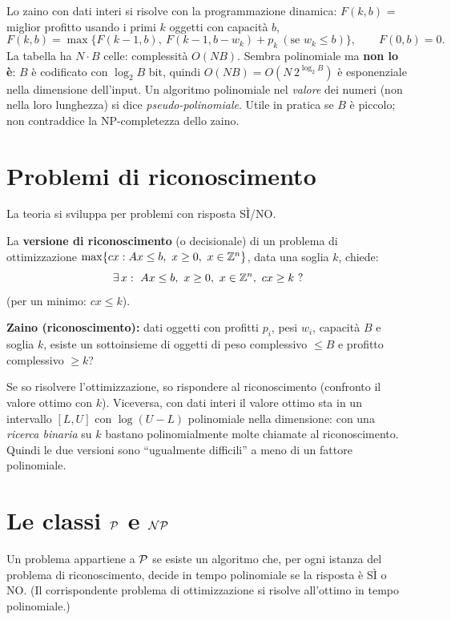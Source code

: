 \begin{extra}
Lo zaino con dati interi si risolve con la programmazione dinamica: $F(k,b)$ = miglior profitto usando i primi $k$ oggetti con capacità $b$,
\[F(k,b)=\max\{F(k-1,b),\ F(k-1,b-w_k)+p_k\ (\text{se } w_k\le b)\},\qquad F(0,b)=0.\]
La tabella ha $N\cdot B$ celle: complessità $O(NB)$. Sembra polinomiale ma \textbf{non lo è}: $B$ è codificato con $\log_2B$ bit, quindi $O(NB)=O(N\,2^{\log_2B})$ è esponenziale nella dimensione dell'input. Un algoritmo polinomiale nel \emph{valore} dei numeri (non nella loro lunghezza) si dice \emph{pseudo-polinomiale}. Utile in pratica se $B$ è piccolo; non contraddice la NP-completezza dello zaino.
\end{extra}

\section{Problemi di riconoscimento}

La teoria si sviluppa per problemi con risposta SÌ/NO.
\begin{defbox}
La \textbf{versione di riconoscimento} (o decisionale) di un problema di ottimizzazione $\max\{cx: Ax\le b,\ x\ge0,\ x\in\mathbb{Z}^n\}$, data una soglia $k$, chiede:
\[ \exists\,x:\ Ax\le b,\ x\ge 0,\ x\in\Z^n,\ cx\ge k\ ? \]
(per un minimo: $cx\le k$).
\end{defbox}
\textbf{Zaino (riconoscimento):} dati oggetti con profitti $p_i$, pesi $w_i$, capacità $B$ e soglia $k$, esiste un sottoinsieme di oggetti di peso complessivo $\le B$ e profitto complessivo $\ge k$?

\begin{oss}
Se so risolvere l'ottimizzazione, so rispondere al riconoscimento (confronto il valore ottimo con $k$). Viceversa, con dati interi il valore ottimo sta in un intervallo $[L,U]$ con $\log(U-L)$ polinomiale nella dimensione: con una \emph{ricerca binaria} su $k$ bastano polinomialmente molte chiamate al riconoscimento. Quindi le due versioni sono ``ugualmente difficili'' a meno di un fattore polinomiale.
\end{oss}

\section{Le classi \texorpdfstring{$\Pc$}{P} e \texorpdfstring{$\mathcal{NP}$}{NP}}

\begin{defbox}[classe $\Pc$]
Un problema appartiene a $\Pc$ se esiste un algoritmo che, per ogni istanza del problema di riconoscimento, decide in tempo polinomiale se la risposta è SÌ o NO. (Il corrispondente problema di ottimizzazione si risolve all'ottimo in tempo polinomiale.)
\end{defbox}


